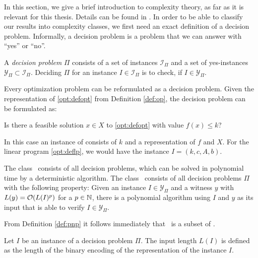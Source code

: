 In this section, we give a brief introduction to complexity theory, as far as it is relevant for this thesis. Details can be found in \cite{Pap94}. In order to be able to classify our results into complexity classes, we first need an exact definition of a decision problem. Informally, a decision problem is a problem that we can answer with ``yes'' or ``no''.\medskip

\begin{definition}
	\label{def:decisionprob}
	A \textit{decision problem} $\Pi$ consists of a set of instances $\mathcal{I}_{\Pi}$ and a set of yes-instances $\mathcal{Y}_{\Pi} \subset \mathcal{I}_{\Pi}$. Deciding $\Pi$ for an instance $I \in \mathcal{I}_{\Pi}$ is to check, if $I \in \mathcal{Y}_{\Pi}$.
\end{definition}

Every optimization problem can be reformulated as a decision problem. Given the representation of \eqref{opt:defopt} from Definition \ref{def:op}, the decision problem can be formulated as:

\begin{center}
	Is there a feasible solution $x \in X$ to \eqref{opt:defopt} with value $f(x) \leq k$?
\end{center}

In this case an instance of consists of $k$ and a representation of $f$ and $X$. For the linear program \eqref{opt:deflp}, we would have the instance $I = (k, c, A, b)$.

\begin{definition}
	\label{def:pnp}
	The class \PP\ consists of all decision problems, which can be solved in polynomial time by a deterministic algorithm.	The class \NP\ consists of all decision problems $\Pi$ with the following property: Given an instance $I \in \mathcal{Y}_{\Pi}$ and a witness $y$ with $L(y) = \mathcal{O}(L(I)^p)$ for a $p \in \mathbb{N}$, there is a polynomial algorithm using $I$ and $y$ as its input that is able to verify $I \in \mathcal{Y}_{\Pi}$.
\end{definition}

From Definition \ref{def:pnp} it follows immediately that \PP\ is a subset of \NP.

\begin{definition}
	\label{def:inputlength}
	Let $I$ be an instance of a decision problem $\Pi$. The input length $L(I)$ is defined as the length of the binary encoding of the representation of the instance $I$.
\end{definition}

